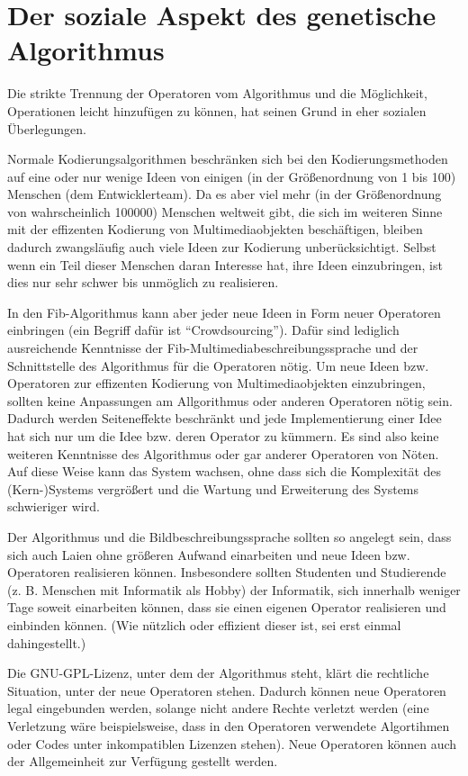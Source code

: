 \section{Der soziale Aspekt des genetische Algorithmus}

Die strikte Trennung der Operatoren vom Algorithmus und die Möglichkeit, Operationen leicht hinzufügen zu können, hat seinen Grund in eher sozialen Überlegungen.

Normale Kodierungsalgorithmen beschränken sich bei den Kodierungsmethoden auf eine oder nur wenige Ideen von einigen (in der Größenordnung von 1 bis 100) Menschen (dem Entwicklerteam). Da es aber viel mehr (in der Größenordnung von wahrscheinlich 100000) Menschen weltweit gibt, die sich im weiteren Sinne mit der effizenten Kodierung von Multimediaobjekten beschäftigen, bleiben dadurch zwangsläufig auch viele Ideen zur Kodierung unberücksichtigt. Selbst wenn ein Teil dieser Menschen daran Interesse hat, ihre Ideen einzubringen, ist dies nur sehr schwer bis unmöglich zu realisieren.

In den Fib-Algorithmus kann aber jeder neue Ideen in Form neuer Operatoren einbringen (ein Begriff dafür ist ``Crowdsourcing''). Dafür sind lediglich ausreichende Kenntnisse der Fib-Multi\-media\-beschrei\-bungs\-sprache und der Schnittstelle des Algorithmus für die Operatoren nötig. Um neue Ideen bzw. Operatoren zur effizenten Kodierung von Multimediaobjekten einzubringen, sollten keine Anpassungen am Allgorithmus oder anderen Operatoren nötig sein. Dadurch werden Seiteneffekte beschränkt und jede Implementierung einer Idee hat sich nur um die Idee bzw. deren Operator zu kümmern. Es sind also keine weiteren Kenntnisse des Algorithmus oder gar anderer Operatoren von Nöten. Auf diese Weise kann das System wachsen, ohne dass sich die Komplexität des (Kern-)Systems vergrößert und die Wartung und Erweiterung des Systems schwieriger wird.

Der Algorithmus und die Bildbeschreibungssprache sollten so angelegt sein, dass sich auch Laien ohne größeren Aufwand einarbeiten und neue Ideen bzw. Operatoren realisieren können. Insbesondere sollten Studenten und Studierende (z. B. Menschen mit Informatik als Hobby) der Informatik, sich innerhalb weniger Tage soweit einarbeiten können, dass sie einen eigenen Operator realisieren und einbinden können. (Wie nützlich oder effizient dieser ist, sei erst einmal dahingestellt.)

Die GNU-GPL-Lizenz, unter dem der Algorithmus steht, klärt die rechtliche Situation, unter der neue Operatoren stehen. Dadurch können neue Operatoren legal eingebunden werden, solange nicht andere Rechte verletzt werden (eine Verletzung wäre beispielsweise, dass in den Operatoren verwendete Algortihmen oder Codes unter inkompatiblen Lizenzen stehen). Neue Operatoren können auch der Allgemeinheit zur Verfügung gestellt werden.

